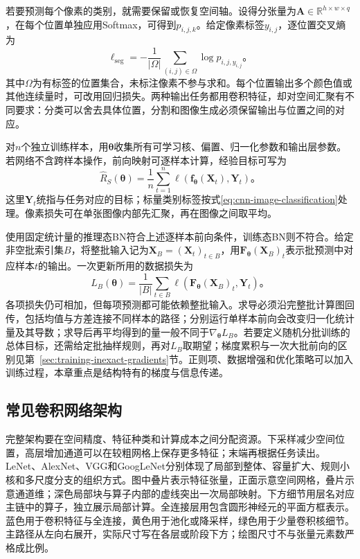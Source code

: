 若要预测每个像素的类别，就需要保留或恢复空间轴。设得分张量为$\bm A\in\mathbb R^{h\times w\times q}$，在每个位置单独应用Softmax，可得到$p_{i,j,k}$。给定像素标签$y_{i,j}$，逐位置交叉熵为
\begin{equation}
  \ell_{\mathrm{seg}}=-\frac1{|\Omega|}
    \sum_{(i,j)\in\Omega}\log p_{i,j,y_{i,j}}\text{。}
  \label{eq:cnn-segmentation-loss}
\end{equation}
其中$\Omega$为有标签的位置集合，未标注像素不参与求和。每个位置输出多个颜色值或其他连续量时，可改用回归损失。两种输出任务都用卷积特征，却对空间汇聚有不同要求：分类可以舍去具体位置，分割和图像生成必须保留输出与位置之间的对应。

对$n$个独立训练样本，用$\bm\theta$收集所有可学习核、偏置、归一化参数和输出层参数。若网络不含跨样本操作，前向映射可逐样本计算，经验目标可写为
\begin{equation}
  \widehat R_S(\bm\theta)=\frac1n\sum_{t=1}^{n}
    \ell\!\left(\bm f_{\bm\theta}(\bm X_t),\bm Y_t\right)\text{。}
  \label{eq:cnn-training-objective}
\end{equation}
这里$\bm Y_t$统指与任务对应的目标；标量类别标签按式\eqref{eq:cnn-image-classification}处理。像素损失可在单张图像内部先汇聚，再在图像之间取平均。

使用固定统计量的推理态BN符合上述逐样本前向条件，训练态BN则不符合。给定非空批索引集$B$，将整批输入记为$\bm X_B=(\bm X_t)_{t\in B}$，用$\bm F_{\bm\theta}(\bm X_B)_t$表示批预测中对应样本$t$的输出。一次更新所用的数据损失为
\begin{equation}
  L_B(\bm\theta)=\frac1{|B|}\sum_{t\in B}
    \ell\!\left(\bm F_{\bm\theta}(\bm X_B)_t,\bm Y_t\right)\text{。}
  \label{eq:cnn-batch-objective}
\end{equation}
各项损失仍可相加，但每项预测都可能依赖整批输入。求导必须沿完整批计算图回传，包括均值与方差连接不同样本的路径；分别运行单样本前向会改变归一化统计量及其导数；求导后再平均得到的量一般不同于$\nabla_{\bm\theta}L_B$。若要定义随机分批训练的总体目标，还需给定批抽样规则，再对$L_B$取期望；梯度累积与一次大批前向的区别见第~\ref{sec:training-inexact-gradients}节。正则项、数据增强和优化策略可以加入训练过程，本章重点是结构特有的梯度与信息传递。

\FloatBarrier

\subsection{常见卷积网络架构}
\label{sec:cnn-classic-architectures}

完整架构要在空间精度、特征种类和计算成本之间分配资源。下采样减少空间位置，高层增加通道可以在较粗网格上保存更多特征；末端再根据任务读出。LeNet、AlexNet、VGG和GoogLeNet分别体现了局部到整体、容量扩大、规则小核和多尺度分支的组织方式。图中叠片表示特征张量，正面示意空间网格，叠片示意通道维；深色局部块与算子内部的虚线突出一次局部映射。下方细节用层名对应主链中的算子，独立展示局部计算。全连接层用包含圆形神经元的平面方框表示。蓝色用于卷积特征与全连接，黄色用于池化或降采样，绿色用于少量卷积核细节。主路径从左向右展开，实际尺寸写在各层或阶段下方；绘图尺寸不与张量元素数严格成比例。

